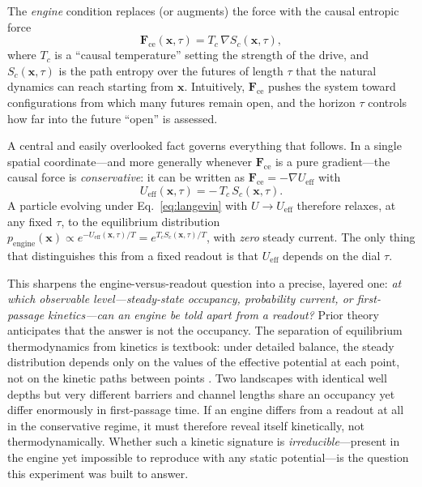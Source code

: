 \documentclass[11pt]{article}
\begin{document}
The \emph{engine} condition replaces (or augments) the force with the causal entropic force \cite{wgf}
\begin{equation}
\mathbf{F}_{\text{ce}}(\mathbf{x},\tau) = T_c\,\nabla S_c(\mathbf{x},\tau),
\label{eq:cef}
\end{equation}
where $T_c$ is a ``causal temperature'' setting the strength of the drive, and $S_c(\mathbf{x},\tau)$ is the path entropy over the futures of length $\tau$ that the natural dynamics can reach starting from $\mathbf{x}$. Intuitively, $\mathbf{F}_{\text{ce}}$ pushes the system toward configurations from which many futures remain open, and the horizon $\tau$ controls how far into the future ``open'' is assessed.

A central and easily overlooked fact governs everything that follows. In a single spatial coordinate---and more generally whenever $\mathbf{F}_{\text{ce}}$ is a pure gradient---the causal force is \emph{conservative}: it can be written as $\mathbf{F}_{\text{ce}}=-\nabla U_{\text{eff}}$ with
\begin{equation}
U_{\text{eff}}(\mathbf{x},\tau) = -\,T_c\,S_c(\mathbf{x},\tau).
\label{eq:ueff}
\end{equation}
A particle evolving under Eq.~\eqref{eq:langevin} with $U\to U_{\text{eff}}$ therefore relaxes, at any fixed $\tau$, to the equilibrium distribution $p_{\text{engine}}(\mathbf{x})\propto e^{-U_{\text{eff}}(\mathbf{x},\tau)/T}=e^{T_c S_c(\mathbf{x},\tau)/T}$, with \emph{zero} steady current. The only thing that distinguishes this from a fixed readout is that $U_{\text{eff}}$ depends on the dial $\tau$.

This sharpens the engine-versus-readout question into a precise, layered one: \emph{at which observable level---steady-state occupancy, probability current, or first-passage kinetics---can an engine be told apart from a readout?} Prior theory anticipates that the answer is not the occupancy. The separation of equilibrium thermodynamics from kinetics is textbook: under detailed balance, the steady distribution depends only on the values of the effective potential at each point, not on the kinetic paths between points \cite{kramers,hanggi}. Two landscapes with identical well depths but very different barriers and channel lengths share an occupancy yet differ enormously in first-passage time. If an engine differs from a readout at all in the conservative regime, it must therefore reveal itself kinetically, not thermodynamically. Whether such a kinetic signature is \emph{irreducible}---present in the engine yet impossible to reproduce with any static potential---is the question this experiment was built to answer.
\end{document}
